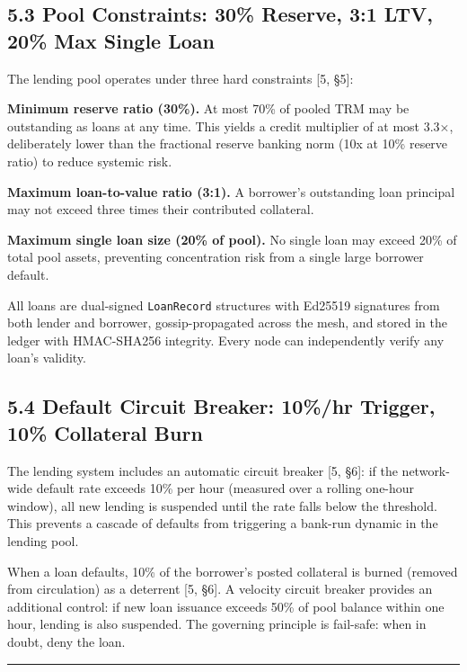 \documentclass[
  11pt,
]{article}
\begin{document}
\subsection{5.3 Pool Constraints: 30\% Reserve, 3:1 LTV, 20\% Max Single
Loan}\label{pool-constraints-30-reserve-31-ltv-20-max-single-loan}

The lending pool operates under three hard constraints {[}5, §5{]}:

\textbf{Minimum reserve ratio (30\%).} At most 70\% of pooled TRM may be
outstanding as loans at any time. This yields a credit multiplier of at
most 3.3×, deliberately lower than the fractional reserve banking norm
(10x at 10\% reserve ratio) to reduce systemic risk.

\textbf{Maximum loan-to-value ratio (3:1).} A borrower's outstanding
loan principal may not exceed three times their contributed collateral.

\textbf{Maximum single loan size (20\% of pool).} No single loan may
exceed 20\% of total pool assets, preventing concentration risk from a
single large borrower default.

All loans are dual-signed \texttt{LoanRecord} structures with Ed25519
signatures from both lender and borrower, gossip-propagated across the
mesh, and stored in the ledger with HMAC-SHA256 integrity. Every node
can independently verify any loan's validity.

\subsection{5.4 Default Circuit Breaker: 10\%/hr Trigger, 10\%
Collateral
Burn}\label{default-circuit-breaker-10hr-trigger-10-collateral-burn}

The lending system includes an automatic circuit breaker {[}5, §6{]}: if
the network-wide default rate exceeds 10\% per hour (measured over a
rolling one-hour window), all new lending is suspended until the rate
falls below the threshold. This prevents a cascade of defaults from
triggering a bank-run dynamic in the lending pool.

When a loan defaults, 10\% of the borrower's posted collateral is burned
(removed from circulation) as a deterrent {[}5, §6{]}. A velocity
circuit breaker provides an additional control: if new loan issuance
exceeds 50\% of pool balance within one hour, lending is also suspended.
The governing principle is fail-safe: when in doubt, deny the loan.

\begin{center}\rule{0.5\linewidth}{0.5pt}\end{center}
\end{document}
